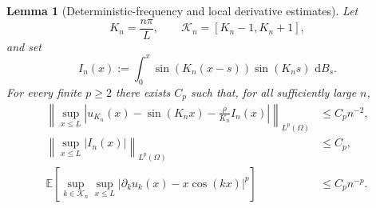 \documentclass[11pt]{article}
\newtheorem{lemma}[theorem]{Lemma}
\newcommand{\dd}{\,\mathrm d}
\newcommand{\E}{\mathbb E}
\begin{document}
\begin{lemma}[Deterministic-frequency and local derivative estimates]\label{lem:eigenfunction-uniform}
Let
\[
    K_n=\frac{n\pi}{L},\qquad \mathcal K_n=[K_n-1,K_n+1],
\]
and set
\[
    I_n(x):=\int_0^x\sin\left(K_n(x-s)\right)\sin(K_ns)\,\dd B_s .
\]
For every finite $p\ge2$ there exists $C_p$ such that, for all sufficiently large $n$,
\begin{align}
    \left\|\sup_{x\le L}
    \left|u_{K_n}(x)-\sin(K_nx)-\frac{\rho}{K_n}I_n(x)\right|\right\|_{L^p(\Omega)}
    &\le C_p n^{-2}, \label{eq:det-rem-un}\\
    \left\|\sup_{x\le L}|I_n(x)|\right\|_{L^p(\Omega)}
    &\le C_p, \label{eq:det-In-un}\\
    \E\left[\sup_{k\in\mathcal K_n}\sup_{x\le L}
    |\partial_k u_k(x)-x\cos(kx)|^p\right]
    &\le C_p n^{-p}. \label{eq:local-uk-der-un}
\end{align}
\end{lemma}
\end{document}
